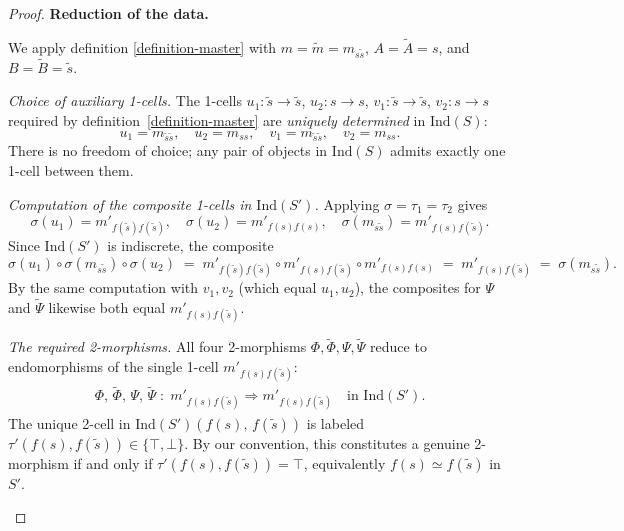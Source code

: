 \documentclass[a4paper,10pt]{article}
\theoremstyle{plain}
\theoremstyle{definition}
\theoremstyle{remark}
\begin{document}
\begin{proof}

  \medskip
  \noindent\textbf{Reduction of the data.}

  \medskip
  We apply definition \ref{definition-master} with $m = \tilde{m} = m_{s\tilde{s}}$,
  $A = \tilde{A} = s$, and $B = \tilde{B} = \tilde{s}$.

  \smallskip
  \noindent\emph{Choice of auxiliary 1-cells.}
  The 1-cells $u_1 : \tilde{s} \to \tilde{s}$, $u_2 : s \to s$,
  $v_1 : \tilde{s} \to \tilde{s}$, $v_2 : s \to s$ required by
  definition~\ref{definition-master} are \emph{uniquely determined} in $\mathrm{Ind}(S)$:
  \[
    u_1 = m_{\tilde{s}\tilde{s}}, \quad
    u_2 = m_{ss}, \quad
    v_1 = m_{\tilde{s}\tilde{s}}, \quad
    v_2 = m_{ss}.
  \]
  There is no freedom of choice; any pair of objects in $\mathrm{Ind}(S)$ admits
  exactly one 1-cell between them.

  \smallskip
  \noindent\emph{Computation of the composite 1-cells in $\mathrm{Ind}(S')$.}
  Applying $\sigma = \tau_1 = \tau_2$ gives
  \[
    \sigma(u_1) = m'_{f(\tilde{s})f(\tilde{s})}, \quad
    \sigma(u_2) = m'_{f(s)f(s)}, \quad
    \sigma(m_{s\tilde{s}}) = m'_{f(s)f(\tilde{s})}.
  \]
  Since $\mathrm{Ind}(S')$ is indiscrete, the composite
  \[
    \sigma(u_1) \circ \sigma(m_{s\tilde{s}}) \circ \sigma(u_2)
    \;=\; m'_{f(\tilde{s})f(\tilde{s})} \circ
    m'_{f(s)f(\tilde{s})} \circ
    m'_{f(s)f(s)}
    \;=\; m'_{f(s)f(\tilde{s})}
    \;=\; \sigma(m_{s\tilde{s}}).
  \]
  By the same computation with $v_1, v_2$ (which equal $u_1, u_2$), the
  composites for $\Psi$ and $\widetilde{\Psi}$ likewise both equal
  $m'_{f(s)f(\tilde{s})}$.

  \smallskip
  \noindent\emph{The required 2-morphisms.}
  All four 2-morphisms $\Phi, \widetilde{\Phi}, \Psi, \widetilde{\Psi}$
  reduce to endomorphisms of the single 1-cell
  $m'_{f(s)f(\tilde{s})}$:
  \begin{align}
    \Phi,\,\widetilde{\Phi},\,\Psi,\,\widetilde{\Psi}
    \;:\;
    m'_{f(s)f(\tilde{s})} \Rightarrow m'_{f(s)f(\tilde{s})}
    \quad \text{in } \mathrm{Ind}(S').
    \label{eq:2cells}
  \end{align}
  The unique 2-cell in $\mathrm{Ind}(S')(f(s),\,f(\tilde{s}))$ is labeled
  $\tau'(f(s), f(\tilde{s})) \in \{\top, \bot\}$. By our convention, this
  constitutes a genuine 2-morphism if and only if
  $\tau'(f(s), f(\tilde{s})) = \top$, equivalently $f(s) \simeq f(\tilde{s})$
  in $S'$.

  \begin{itemize}
  

\end{itemize}
\end{proof}
\end{document}

